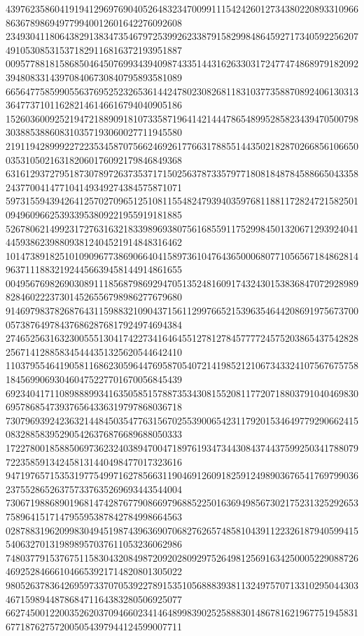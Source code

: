 \begin{DoxyCode}
      439762358604191941296976904052648323470099111542426012734380220893310966863678986949779940012601642276092608
      234930411806438291383473546797253992623387915829984864592717340592256207491053085315371829116816372193951887
      009577881815868504645076993439409874335144316263303172477474868979182092394808331439708406730840795893581089
      665647758599055637695252326536144247802308268118310377358870892406130313364773710116282146146616794040905186
      152603600925219472188909181073358719641421444786548995285823439470500798303885388608310357193060027711945580
      219119428999227223534587075662469261776631788551443502182870266856106650035310502163182060176092179846849368
      631612937279518730789726373537171502563787335797718081848784588665043358243770041477104149349274384575871071
      597315594394264125702709651251081155482479394035976811881172824721582501094960966253933953809221955919181885
      526780621499231727631632183398969380756168559117529984501320671293924041445938623988093812404521914848316462
      101473891825101090967738690664041589736104764365000680771056567184862814963711188321924456639458144914861655
      004956769826903089111856879869294705135248160917432430153836847072928989828460222373014526556798986277679680
      914697983782687643115988321090437156112997665215396354644208691975673700057387649784376862876817924974694384
      274652563163230055513041742273416464551278127845777724575203865437542828256714128858345444351325620544642410
      110379554641905811686230596447695870540721419852121067343324107567675758184569906930460475227701670056845439
      692340417110898889934163505851578873534308155208117720718803791040469830695786854739376564336319797868036718
      730796939242363214484503547763156702553900654231179201534649779290662415083288583952905426376876689688050333
      172278001858850697362324038947004718976193473443084374437599250341788079722358591342458131440498477017323616
      947197657153531977549971627856631190469126091825912498903676541769799036237552865263757337635269693443544004
      730671988689019681474287677908669796885225016369498567302175231325292653758964151714795595387842784998664563
      028788319620998304945198743963690706827626574858104391122326187940599415540632701319898957037611053236062986
      748037791537675115830432084987209202809297526498125691634250005229088726469252846661046653921714820801305022
      980526378364269597337070539227891535105688839381132497570713310295044303467159894487868471164383280506925077
      662745001220035262037094660234146489983902525888301486781621967751945831677187627572005054397944124599007711

\end{DoxyCode}
